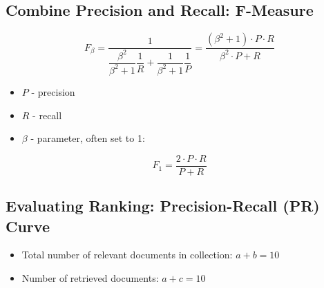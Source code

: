 \subsection{Combine Precision and Recall: F-Measure}

\begin{equation*}
F_\beta = \frac{1}{\dfrac{\beta^2}{\beta^2+1}\dfrac{1}{R} + \dfrac{1}{\beta^2+1}\dfrac{1}{P}} = \frac{(\beta^2+1)\cdot P \cdot R}{\beta^2 \cdot P + R}
\end{equation*}

\begin{itemize}
\item $P$ - precision
\item $R$ - recall
\item $\beta$ - parameter, often set to 1:
\end{itemize}

\begin{equation*}
F_1 = \dfrac{2 \cdot P \cdot R}{P+R}
\end{equation*}


\subsection{Evaluating Ranking: Precision-Recall (PR) Curve}
\begin{itemize}
\item Total number of relevant documents in collection: $a+b = 10$
\item Number of retrieved documents: $a+c = 10$
\end{itemize}



